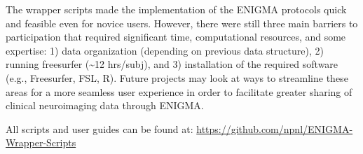 \documentclass[twocolumn]{bmcart}%
\begin{document}
The wrapper scripts made the implementation of the ENIGMA protocols quick and feasible even for novice users. However, there were still three main barriers to participation that required significant time, computational resources, and some expertise: 1) data organization (depending on previous data structure), 2) running freesurfer (\textasciitilde{}12 hrs/subj), and 3) installation of the required software (e.g., Freesurfer, FSL, R). Future projects may look at ways to streamline these areas for a more seamless user experience in order to facilitate greater sharing of clinical neuroimaging data through ENIGMA.

All scripts and user guides can be found at: \url{https://github.com/npnl/ENIGMA-Wrapper-Scripts}

\end{document}
